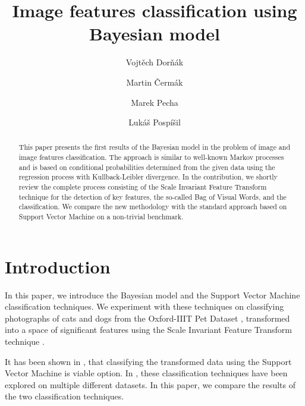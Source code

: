 \documentclass{aip-cp}
\begin{document}
\title{Image features classification using Bayesian model}

\author[aff1,aff2]{Vojt\v{e}ch Dor\v{n}\'{a}k}
\author[aff1,aff2]{Martin \v{C}erm\'{a}k}
\author[aff2]{Marek Pecha}
\author[aff1]{Luk\'{a}\v{s} Posp\'{i}\v{s}il}


\maketitle

\begin{abstract}
    This paper presents the first results of the Bayesian model in the problem of image and image features classification. The approach is similar to well-known Markov processes and is based on conditional probabilities determined from the given data using the regression process with Kullback-Leibler divergence. In the contribution, we shortly review the complete process consisting of the Scale Invariant Feature Transform technique for the detection of key features, the so-called Bag of Visual Words, and the classification. We compare the new methodology with the standard approach based on Support Vector Machine on a non-trivial benchmark.
\end{abstract}

\maketitle

\section{Introduction}
In this paper, we introduce the Bayesian model and the Support Vector Machine classification techniques. We experiment with these techniques on classifying photographs of cats and dogs from the Oxford-IIIT Pet Dataset \cite{parkhi12a}, transformed into a space of significant features using the Scale Invariant Feature Transform technique \cite{Lowe2004}.

It has been shown in \cite{dornak2020}, that classifying the transformed data using the Support Vector Machine is viable option. In \cite{dornak2021}, these classification techniques have been explored on multiple different datasets. In this paper, we compare the results of the two classification techniques.
\end{document}
